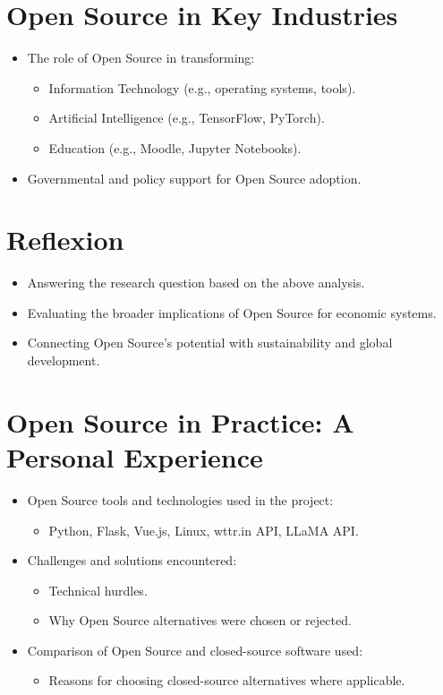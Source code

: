 \section{Open Source in Key Industries}

\begin{itemize}
    \item The role of Open Source in transforming:
    \begin{itemize}
        \item Information Technology (e.g., operating systems, tools).
        \item Artificial Intelligence (e.g., TensorFlow, PyTorch).
        \item Education (e.g., Moodle, Jupyter Notebooks).
    \end{itemize}
    \item Governmental and policy support for Open Source adoption.
\end{itemize}

\section{Reflexion}

\begin{itemize}
    \item Answering the research question based on the above analysis.
    \item Evaluating the broader implications of Open Source for economic systems.
    \item Connecting Open Source's potential with sustainability and global development.
\end{itemize}

\section{Open Source in Practice: A Personal Experience}

\begin{itemize}
    \item Open Source tools and technologies used in the project:
    \begin{itemize}
        \item Python, Flask, Vue.js, Linux, wttr.in API, LLaMA API.
    \end{itemize}
    \item Challenges and solutions encountered:
    \begin{itemize}
        \item Technical hurdles.
        \item Why Open Source alternatives were chosen or rejected.
    \end{itemize}
    \item Comparison of Open Source and closed-source software used:
    \begin{itemize}
        \item Reasons for choosing closed-source alternatives where applicable.
    \end{itemize}
\end{itemize}

